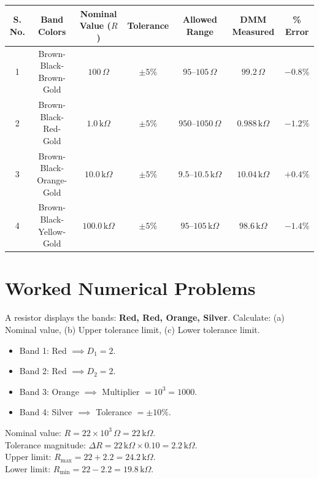 \begin{observationtable}
\begin{center}
\begin{tabular}{ccccccc}
\toprule
\textbf{S. No.} & \textbf{Band Colors} & \textbf{Nominal Value ($R$)} & \textbf{Tolerance} & \textbf{Allowed Range} & \textbf{DMM Measured} & \textbf{\% Error} \\
\midrule
1 & Brown-Black-Brown-Gold & $100\,\Omega$ & $\pm 5\%$ & $95\text{--}105\,\Omega$ & $99.2\,\Omega$ & $-0.8\%$ \\
2 & Brown-Black-Red-Gold & $1.0\,\mathrm{k}\Omega$ & $\pm 5\%$ & $950\text{--}1050\,\Omega$ & $0.988\,\mathrm{k}\Omega$ & $-1.2\%$ \\
3 & Brown-Black-Orange-Gold & $10.0\,\mathrm{k}\Omega$ & $\pm 5\%$ & $9.5\text{--}10.5\,\mathrm{k}\Omega$ & $10.04\,\mathrm{k}\Omega$ & $+0.4\%$ \\
4 & Brown-Black-Yellow-Gold & $100.0\,\mathrm{k}\Omega$ & $\pm 5\%$ & $95\text{--}105\,\mathrm{k}\Omega$ & $98.6\,\mathrm{k}\Omega$ & $-1.4\%$ \\
\bottomrule
\end{tabular}
\end{center}
\end{observationtable}

\section{Worked Numerical Problems}
\begin{example}
A resistor displays the bands: \textbf{Red, Red, Orange, Silver}. Calculate: (a) Nominal value, (b) Upper tolerance limit, (c) Lower tolerance limit.
\end{example}
\begin{solutionbox}
\begin{itemize}
    \item Band 1: Red $\implies D_1 = 2$.
    \item Band 2: Red $\implies D_2 = 2$.
    \item Band 3: Orange $\implies$ Multiplier $= 10^3 = 1000$.
    \item Band 4: Silver $\implies$ Tolerance $= \pm 10\%$.
\end{itemize}
Nominal value: $R = 22 \times 10^3\,\Omega = 22\,\mathrm{k}\Omega$.\\
Tolerance magnitude: $\Delta R = 22\,\mathrm{k}\Omega \times 0.10 = 2.2\,\mathrm{k}\Omega$.\\
Upper limit: $R_{\max} = 22 + 2.2 = 24.2\,\mathrm{k}\Omega$.\\
Lower limit: $R_{\min} = 22 - 2.2 = 19.8\,\mathrm{k}\Omega$.
\end{solutionbox}

